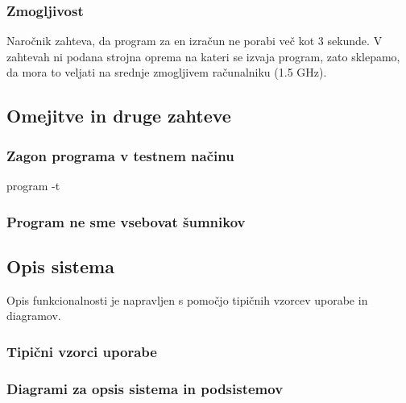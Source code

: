 \documentclass[a4paper,12pt]{article}
\begin{document}
			\subsubsection{Zmogljivost}

			\qquad Naročnik zahteva, da program za en izračun ne porabi več kot 3 sekunde. 
			V zahtevah ni podana strojna oprema na kateri se izvaja program, zato sklepamo, 
			da mora to veljati na srednje zmogljivem računalniku (1.5 GHz).

		\subsection{Omejitve in druge zahteve}

			\subsubsection{Zagon programa v testnem načinu}

				\qquad \qquad program -t

			\subsubsection{Program ne sme vsebovat šumnikov}

		\subsection{Opis sistema}

			\qquad Opis funkcionalnosti je napravljen s pomočjo tipičnih vzorcev uporabe in diagramov.

			\subsubsection{Tipični vzorci uporabe}

			\subsubsection{Diagrami za opsis sistema in podsistemov}
\end{document}
